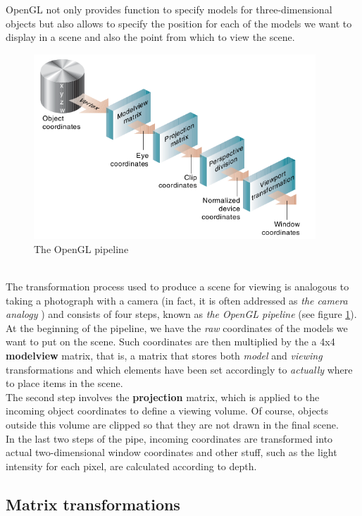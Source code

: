 OpenGL not only provides function to specify models for 
three-dimensional objects but also allows to specify the 
position for each of the models we want to display in a 
scene and also the point from which to view the scene.
\begin{figure}[!h]
  \begin{center}
    \includegraphics[width=300pt]{img/openGLpipe.png}
    \caption{The OpenGL pipeline}
    \label{fig:openglpipe}
  \end{center}
\end{figure}
\\
The transformation process used to produce a scene for viewing 
is analogous to taking a photograph with a camera (in fact, it 
is often addressed as \textit{the camera analogy} 
\cite{opengl:cameraanalogy}) 
and consists of four steps, known as
\textit{the OpenGL pipeline} (see figure \ref{fig:openglpipe}).
\\
At the beginning of the pipeline, we have the \textit{raw} 
coordinates of the models we want to put on the scene. Such 
coordinates are then multiplied by the a 4x4 \textbf{modelview} 
matrix, that is, a matrix that stores both \textit{model} and 
\textit{viewing} transformations and which elements have been set 
accordingly to \textit{actually} where to place items in the scene.
\\
The second step involves the \textbf{projection} matrix, 
which is applied to the incoming object coordinates to define a 
viewing volume. Of course, objects outside this volume are clipped 
so that they are not drawn in the final scene. 
\\
In the last two steps of the pipe, incoming coordinates are transformed 
into actual two-dimensional window coordinates and other stuff, such as 
the light intensity for each pixel, are calculated according to depth.

\subsection{Matrix transformations}
\label{opengl:opengl_note:matrix_transfor}

